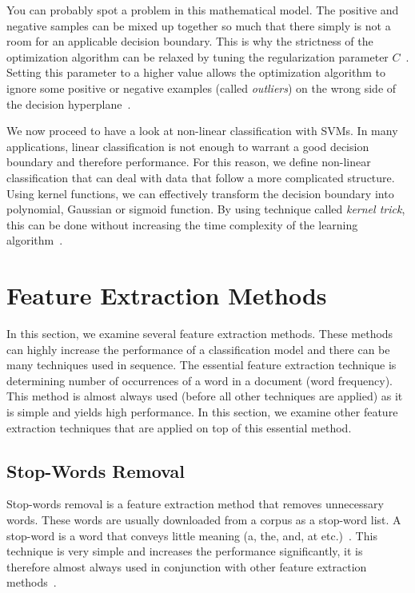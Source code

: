 You can probably spot a problem in this mathematical model. The positive and negative samples can be mixed up together so much that there simply is not a room for an applicable decision boundary. This is why the strictness of the optimization algorithm can be relaxed by tuning the regularization parameter $C$~\cite{manning2008introduction}. Setting this parameter to a higher value allows the optimization algorithm to ignore some positive or negative examples (called \textit{outliers}) on the wrong side of the decision hyperplane~\cite{manning2008introduction}.

We now proceed to have a look at non-linear classification with SVMs. In many applications, linear classification is not enough to warrant a good decision boundary and therefore performance. For this reason, we define non-linear classification that can deal with data that follow a more complicated structure. Using kernel functions, we can effectively transform the decision boundary into polynomial, Gaussian or sigmoid function. By using technique called \textit{kernel trick}, this can be done without increasing the time complexity of the learning algorithm~\cite{manning2008introduction}.

\section{Feature Extraction Methods}

In this section, we examine several feature extraction methods. These methods can highly increase the performance of a classification model and there can be many techniques used in sequence. The essential feature extraction technique is determining number of occurrences of a word in a document (word frequency). This method is almost always used (before all other techniques are applied) as it is simple and yields high performance. In this section, we examine other feature extraction techniques that are applied on top of this essential method.

\subsection{Stop-Words Removal}

Stop-words removal is a feature extraction method that removes unnecessary words. These words are usually downloaded from a corpus as a stop-word list. A stop-word is a word that conveys little meaning (a, the, and, at etc.)~\cite{scott1999feature}. This technique is very simple and increases the performance significantly, it is therefore almost always used in conjunction with other feature extraction methods~\cite{scott1999feature}.

